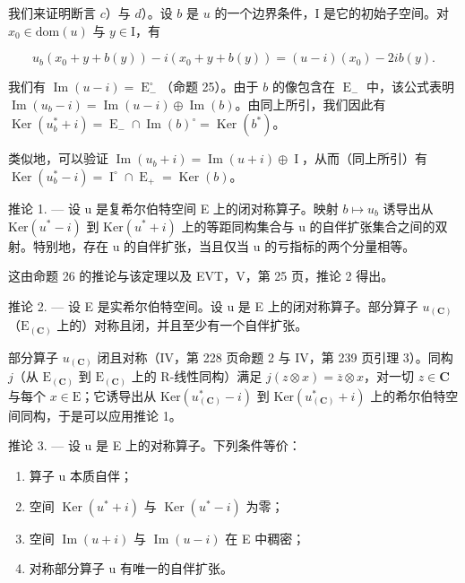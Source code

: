 我们来证明断言 \(c\)）与 \(d\)）。设 \(b\) 是 \(u\) 的一个边界条件，I 是它的初始子空间。对 \(x_0 \in \mathrm{dom}(u)\) 与 \(y \in \mathrm{I}\)，有

\[
u _ {b} (x _ {0} + y + b (y)) - i (x _ {0} + y + b (y)) = (u - i) (x _ {0}) - 2 i b (y).
\]

我们有 \(\operatorname{Im}(u - i) = \operatorname{E}_{-}^{\circ}\)（命题 25）。由于 \(b\) 的像包含在 \(\operatorname{E}_{-}\) 中，该公式表明 \(\operatorname{Im}(u_b - i) = \operatorname{Im}(u - i) \oplus \operatorname{Im}(b)\)。由同上所引，我们因此有 \(\operatorname{Ker}(u_b^* + i) = \operatorname{E}_{-} \cap \operatorname{Im}(b)^{\circ} = \operatorname{Ker}(b^*)\)。

类似地，可以验证 \(\operatorname{Im}(u_b + i) = \operatorname{Im}(u + i) \oplus \operatorname{I}\)，从而（同上所引）有 \(\operatorname{Ker}(u_b^* - i) = \operatorname{I}^\circ \cap \operatorname{E}_+ = \operatorname{Ker}(b)\)。

推论 1. --- 设 u 是复希尔伯特空间 E 上的闭对称算子。映射 \(b \mapsto u_b\) 诱导出从 \(\text{Ker}(u^* - i)\) 到 \(\text{Ker}(u^* + i)\) 上的等距同构集合与 u 的自伴扩张集合之间的双射。特别地，存在 u 的自伴扩张，当且仅当 u 的亏指标的两个分量相等。

这由命题 26 的推论与该定理以及 EVT，V，第 25 页，推论 2 得出。

推论 2. --- 设 E 是实希尔伯特空间。设 u 是 E 上的闭对称算子。部分算子 \(u_{(\mathbf{C})}\)（\(\mathrm{E}_{(\mathbf{C})}\) 上的）对称且闭，并且至少有一个自伴扩张。

部分算子 \(u_{(\mathbf{C})}\) 闭且对称（IV，第 228 页命题 2 与 IV，第 239 页引理 3）。同构 \(j\)（从 \(\mathrm{E}_{(\mathbf{C})}\) 到 \(\mathrm{E}_{(\mathbf{C})}\) 上的 R-线性同构）满足 \(j(z \otimes x) = \overline{z} \otimes x\)，对一切 \(z \in \mathbf{C}\) 与每个 \(x \in \mathrm{E}\)；它诱导出从 \(\mathrm{Ker}(u_{(\mathbf{C})}^* - i)\) 到 \(\mathrm{Ker}(u_{(\mathbf{C})}^* + i)\) 上的希尔伯特空间同构，于是可以应用推论 1。

推论 3. --- 设 u 是 E 上的对称算子。下列条件等价：

\begin{enumerate}
\def\labelenumi{(\roman{enumi})}
\item
  算子 u 本质自伴；
\item
  空间 \(\operatorname{Ker}(u^{*} + i)\) 与 \(\operatorname{Ker}(u^{*} - i)\) 为零；
\item
  空间 \(\operatorname{Im}(u + i)\) 与 \(\operatorname{Im}(u - i)\) 在 E 中稠密；
\item
  对称部分算子 u 有唯一的自伴扩张。
\end{enumerate}

